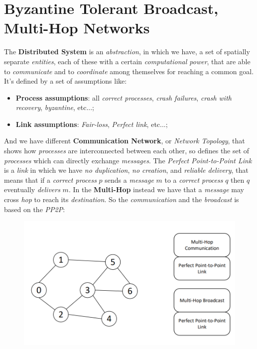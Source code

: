 \documentclass{article}
\begin{document}
\section{Byzantine Tolerant Broadcast, Multi-Hop Networks}
The \textbf{Distributed System} is an \emph{abstraction}, in which we have, a set of spatially separate \emph{entities}, each of these with a certain \emph{computational power}, that are able to \emph{communicate} and to \emph{coordinate} among themselves for reaching a common goal. It's defined by a set of assumptions like:
\begin{itemize}
\item \textbf{Process assumptions}: all \emph{correct processes}, \emph{crash failures}, \emph{crash with recovery}, \emph{byzantine}, etc...;
\item \textbf{Link assumptions}: \emph{Fair-loss}, \emph{Perfect link}, etc...;
\end{itemize}
And we have different \textbf{Communication Network}, or \emph{Network Topology}, that shows how \emph{processes} are interconnected between each other, so defines the set of \emph{processes} which can directly exchange \emph{messages}. The \emph{Perfect Point-to-Point Link} is a \emph{link} in which we have \emph{no duplication}, \emph{no creation}, and \emph{reliable delivery}, that means that if a \emph{correct process} $p$ sends a \emph{message} $m$ to a \emph{correct process} $q$ then $q$ eventually \emph{delivers} $m$. In the \textbf{Multi-Hop} instead we have that a \emph{message} may cross \emph{hop} to reach its \emph{destination}. So the \emph{communication} and the \emph{broadcast} is based on the \emph{PP2P}:
\begin{figure}[H]
  \centering
  \includegraphics[scale=0.89]{cattura92.png}
\end{figure}
\end{document}
